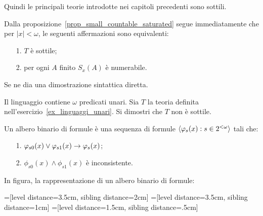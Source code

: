 Quindi le principali teorie introdotte nei capitoli precedenti sono sottili.

\begin{exercise}
Dalla proposizione~\ref{prop_small_countable_saturated} segue immediatamente che per $|x|<\omega$, le seguenti affermazioni sono equivalenti:
\begin{itemize}
\item[1.] $T$ \`e sottile;
\item[2.] per ogni $A$ finito $S_x(A)$ \`e numerabile.
\end{itemize}
Se ne dia una dimostrazione sintattica diretta.\QED
\end{exercise}

\begin{exercise}
Il linguaggio contiene $\omega$ predicati unari. Sia $T$ la teoria definita nell'esercizio~\ref{ex_linguaggi_unari}. Si dimostri che $T$ non \`e sottile.\QED
\end{exercise}

% 

\begin{definition}
Un albero binario di formule \`e una sequenza di formule $\langle\varphi_s(x) : s\in2^{<\omega}\rangle$ tali che:
\begin{itemize}
\item[1.] $\varphi_{s0}(x)\vee\varphi_{s1}(x)\rightarrow\varphi_s(x)$;
\item[2.] $\phi_{s0}(x)\wedge\phi_{s1}(x)$ \`e inconsistente.\QED
\end{itemize}
\end{definition}

In figura, la rappresentazione di un albero binario di formule:


=[level distance=3.5cm, sibling distance=2cm]
=[level distance=3.5cm, sibling distance=1cm]
=[level distance=1.5cm, sibling distance=.5cm]

